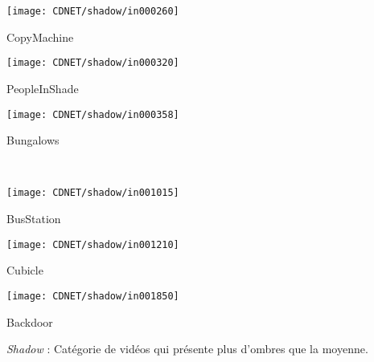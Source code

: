 	\begin{figureth}
		\begin{subfigureth}{0.24\textwidth}
			\texttt{[image: CDNET/shadow/in000260]}\caption{CopyMachine}
		\end{subfigureth}
		\begin{subfigureth}{0.24\textwidth}
			\texttt{[image: CDNET/shadow/in000320]}\caption{PeopleInShade}
		\end{subfigureth}
		\begin{subfigureth}{0.24\textwidth}
			\texttt{[image: CDNET/shadow/in000358]}\caption{Bungalows}	
		\end{subfigureth}\\
		\begin{subfigureth}{0.24\textwidth}
			\texttt{[image: CDNET/shadow/in001015]}\caption{BusStation}	
		\end{subfigureth}
		\begin{subfigureth}{0.24\textwidth}
			\texttt{[image: CDNET/shadow/in001210]}\caption{Cubicle}
		\end{subfigureth}
		\begin{subfigureth}{0.24\textwidth}
			\texttt{[image: CDNET/shadow/in001850]}\caption{Backdoor}	
		\end{subfigureth}
		\caption[Categorie Shadow]{\textit{Shadow} : Catégorie de vidéos qui présente plus d'ombres que la moyenne.}\label{fig:cdnet:shadow}
	\end{figureth}

